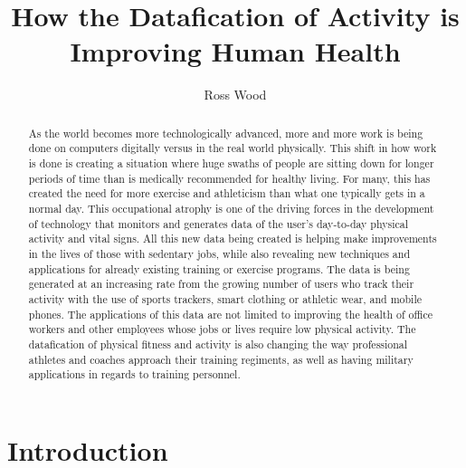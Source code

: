 \documentclass[sigconf]{acmart}
\begin{document}
\title{How the Datafication of Activity is Improving Human Health}


\author{Ross Wood}

\begin{abstract}
As the world becomes more technologically advanced, more and more work is being done on computers digitally versus in the real world physically. This shift in how work is done is creating a situation where huge swaths of people are sitting down for longer periods of time than is medically recommended for healthy living. For many, this has created the need for more exercise and athleticism than what one typically gets in a normal day. This occupational atrophy is one of the driving forces in the development of technology that monitors and generates data of the user's day-to-day physical activity and vital signs. All this new data being created is helping make improvements in the lives of those with sedentary jobs, while also revealing new techniques and applications for already existing training or exercise programs. The data is being generated at an increasing rate from the growing number of users who track their activity with the use of sports trackers, smart clothing or athletic wear, and mobile phones. The applications of this data are not limited to improving the health of office workers and other employees whose jobs or lives require low physical activity. The datafication of physical fitness and activity is also changing the way professional athletes and coaches approach their training regiments, as well as having military applications in regards to training personnel.
\end{abstract}



\maketitle



\section{Introduction}
\end{document}
